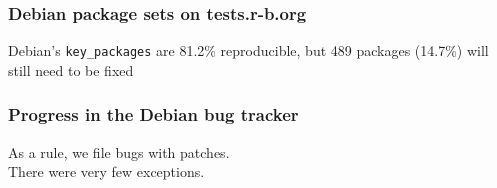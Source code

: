 \documentclass[14pt]{beamer}
\begin{document}
\begin{frame}
 \frametitle{Debian package sets on tests.r-b.org}
 \begin{center}
  \footnotesize{Debian's \texttt{key\_packages} are 81.2\% reproducible,
  but 489 packages (14.7\%) will still need to be fixed}
  \vfill
 \end{center}
\end{frame}


\begin{frame}
 \frametitle{Progress in the Debian bug tracker}
 \begin{center}
  \footnotesize{As a rule, we file bugs with patches. \\
  There were very few exceptions.}
  \vfill
 \end{center}
\end{frame}
\end{document}
